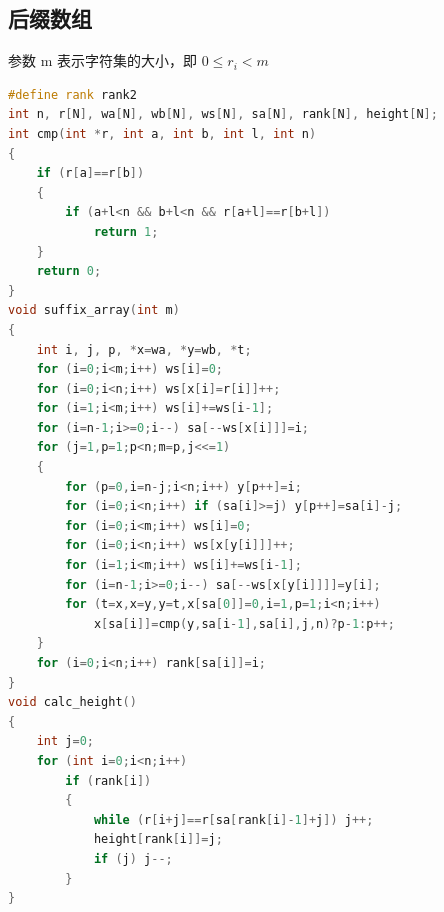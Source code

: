 \documentclass{article}
\begin{document}
\begin{CJK}{UTF8}{song}
\subsection{后缀数组}
参数 m 表示字符集的大小，即 $0 \leq r_i < m$ 
\begin{lstlisting}[language=C++]
#define rank rank2
int n, r[N], wa[N], wb[N], ws[N], sa[N], rank[N], height[N];
int cmp(int *r, int a, int b, int l, int n)
{
	if (r[a]==r[b])
	{
		if (a+l<n && b+l<n && r[a+l]==r[b+l])
			return 1;
	}
	return 0;
}
void suffix_array(int m)
{
	int i, j, p, *x=wa, *y=wb, *t;
	for (i=0;i<m;i++) ws[i]=0;
	for (i=0;i<n;i++) ws[x[i]=r[i]]++;
	for (i=1;i<m;i++) ws[i]+=ws[i-1];
	for (i=n-1;i>=0;i--) sa[--ws[x[i]]]=i;
	for (j=1,p=1;p<n;m=p,j<<=1)
	{
		for (p=0,i=n-j;i<n;i++) y[p++]=i;
		for (i=0;i<n;i++) if (sa[i]>=j) y[p++]=sa[i]-j;
		for (i=0;i<m;i++) ws[i]=0;
		for (i=0;i<n;i++) ws[x[y[i]]]++;
		for (i=1;i<m;i++) ws[i]+=ws[i-1];
		for (i=n-1;i>=0;i--) sa[--ws[x[y[i]]]]=y[i];
		for (t=x,x=y,y=t,x[sa[0]]=0,i=1,p=1;i<n;i++)
			x[sa[i]]=cmp(y,sa[i-1],sa[i],j,n)?p-1:p++;
	}
	for (i=0;i<n;i++) rank[sa[i]]=i;
}
void calc_height()
{
	int j=0;
	for (int i=0;i<n;i++)
		if (rank[i])
		{
			while (r[i+j]==r[sa[rank[i]-1]+j]) j++;
			height[rank[i]]=j;
			if (j) j--;
		}
}
\end{lstlisting}
\newpage

\end{CJK}
\end{document}
